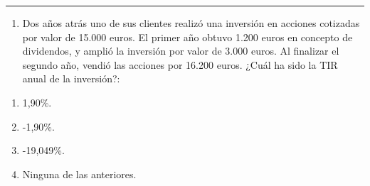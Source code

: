 \documentclass[
  letterpaper,
  DIV=11,
  numbers=noendperiod]{scrreprt}
\providecommand{\tightlist}{%
  \setlength{\itemsep}{0pt}\setlength{\parskip}{0pt}}\usepackage{longtable,booktabs,array}
\begin{document}
\begin{center}\rule{0.5\linewidth}{0.5pt}\end{center}

\begin{enumerate}
\def\labelenumi{\arabic{enumi}.}
\setcounter{enumi}{72}
\tightlist
\item
  Dos años atrás uno de sus clientes realizó una inversión en acciones
  cotizadas por valor de 15.000 euros. El primer año obtuvo 1.200 euros
  en concepto de dividendos, y amplió la inversión por valor de 3.000
  euros. Al finalizar el segundo año, vendió las acciones por 16.200
  euros. ¿Cuál ha sido la TIR anual de la inversión?:
\end{enumerate}

\begin{enumerate}
\def\labelenumi{\alph{enumi})}
\item
  1,90\%.
\item
  -1,90\%.
\item
  -19,049\%.
\item
  Ninguna de las anteriores.
\end{enumerate}
\end{document}
